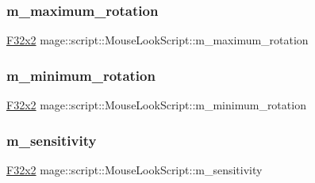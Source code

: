 \subsubsection{\texorpdfstring{m\+\_\+maximum\+\_\+rotation}{m\_maximum\_rotation}}
{\footnotesize\ttfamily \hyperlink{namespacemage_aa87237ad091f5cd7da612b8523fc108f}{F32x2} mage\+::script\+::\+Mouse\+Look\+Script\+::m\+\_\+maximum\+\_\+rotation\hspace{0.3cm}{\ttfamily [private]}}

\hypertarget{classmage_1_1script_1_1_mouse_look_script_a4379e58bd89eab39d3e281133968a959}{}\label{classmage_1_1script_1_1_mouse_look_script_a4379e58bd89eab39d3e281133968a959} 
\subsubsection{\texorpdfstring{m\+\_\+minimum\+\_\+rotation}{m\_minimum\_rotation}}
{\footnotesize\ttfamily \hyperlink{namespacemage_aa87237ad091f5cd7da612b8523fc108f}{F32x2} mage\+::script\+::\+Mouse\+Look\+Script\+::m\+\_\+minimum\+\_\+rotation\hspace{0.3cm}{\ttfamily [private]}}

\hypertarget{classmage_1_1script_1_1_mouse_look_script_afe7a443c1fa56fc6143555f992458934}{}\label{classmage_1_1script_1_1_mouse_look_script_afe7a443c1fa56fc6143555f992458934} 
\subsubsection{\texorpdfstring{m\+\_\+sensitivity}{m\_sensitivity}}
{\footnotesize\ttfamily \hyperlink{namespacemage_aa87237ad091f5cd7da612b8523fc108f}{F32x2} mage\+::script\+::\+Mouse\+Look\+Script\+::m\+\_\+sensitivity\hspace{0.3cm}{\ttfamily [private]}}

